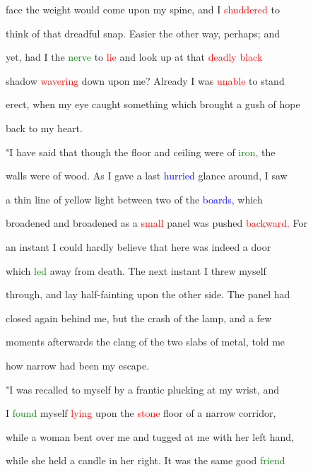  face the \textcolor{BurntOrange}{weight} would come upon my \textcolor{BurntOrange}{spine,} and I \textcolor{red}{shuddered} to

 think of that \textcolor{BurntOrange}{dreadful} snap. Easier the other way, perhaps; and

 yet, had I the \textcolor{green}{nerve} to \textcolor{red}{lie} and look up at that \textcolor{red}{deadly} \textcolor{red}{black}

 shadow \textcolor{red}{wavering} down upon me? Already I was \textcolor{red}{unable} to stand

 erect, when my eye caught something which brought a \textcolor{BurntOrange}{gush} of \textcolor{BurntOrange}{hope}

 back to my heart.



 "I have said that though the floor and ceiling were of \textcolor{green}{iron,} the

 walls were of wood. As I gave a last \textcolor{blue}{hurried} glance around, I saw

 a thin line of yellow light between two of the \textcolor{blue}{boards,} which

 broadened and broadened as a \textcolor{red}{small} panel was pushed \textcolor{red}{backward.} For

 an instant I could hardly believe that here was indeed a door

 which \textcolor{green}{led} away from \textcolor{BurntOrange}{death.} The next instant I threw myself

 through, and lay half-fainting upon the other side. The panel had

 closed again behind me, but the \textcolor{BurntOrange}{crash} of the lamp, and a few

 moments afterwards the clang of the two slabs of metal, told me

 how narrow had been my \textcolor{BurntOrange}{escape.}



 "I was recalled to myself by a \textcolor{BurntOrange}{frantic} plucking at my wrist, and

 I \textcolor{green}{found} myself \textcolor{red}{lying} upon the \textcolor{red}{stone} floor of a narrow corridor,

 while a woman bent over me and tugged at me with her left hand,

 while she held a candle in her right. It was the same \textcolor{BurntOrange}{good} \textcolor{green}{friend}


